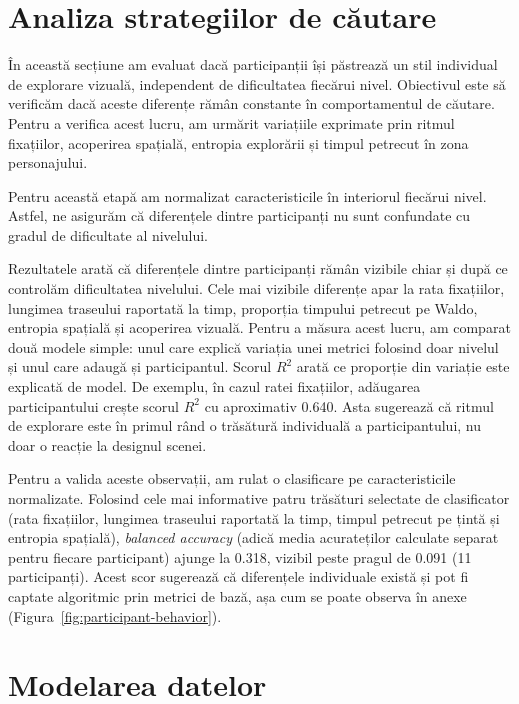\section{Analiza strategiilor de căutare}

În această secțiune am evaluat dacă participanții își păstrează un stil individual de explorare vizuală, independent de dificultatea fiecărui nivel. Obiectivul este să verificăm dacă aceste diferențe rămân constante în comportamentul de căutare. Pentru a verifica acest lucru, am urmărit variațiile exprimate prin ritmul fixațiilor, acoperirea spațială, entropia explorării și timpul petrecut în zona personajului.

Pentru această etapă am normalizat caracteristicile în interiorul fiecărui nivel. Astfel, ne asigurăm că diferențele dintre participanți nu sunt confundate cu gradul de dificultate al nivelului.

Rezultatele arată că diferențele dintre participanți rămân vizibile chiar și după ce controlăm dificultatea nivelului. Cele mai vizibile diferențe apar la rata fixațiilor, lungimea traseului raportată la timp, proporția timpului petrecut pe Waldo, entropia spațială și acoperirea vizuală. Pentru a măsura acest lucru, am comparat două modele simple: unul care explică variația unei metrici folosind doar nivelul și unul care adaugă și participantul. Scorul $R^2$ arată ce proporție din variație este explicată de model. De exemplu, în cazul ratei fixațiilor, adăugarea participantului crește scorul $R^2$ cu aproximativ 0.640. Asta sugerează că ritmul de explorare este în primul rând o trăsătură individuală a participantului, nu doar o reacție la designul scenei.

Pentru a valida aceste observații, am rulat o clasificare pe caracteristicile normalizate. Folosind cele mai informative patru trăsături selectate de clasificator (rata fixațiilor, lungimea traseului raportată la timp, timpul petrecut pe țintă și entropia spațială), \emph{balanced accuracy} (adică media acurateților calculate separat pentru fiecare participant) ajunge la 0.318, vizibil peste pragul de 0.091 (11 participanți). Acest scor sugerează că diferențele individuale există și pot fi captate algoritmic prin metrici de bază, așa cum se poate observa în anexe (Figura~\ref{fig:participant-behavior}).


\section{Modelarea datelor}

